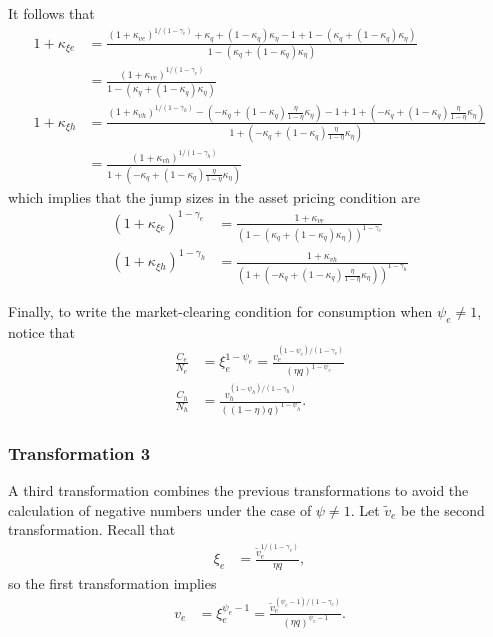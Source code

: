 \documentclass[12 pt, oneside]{article}
\theoremstyle{definition}
\theoremstyle{definition}
\theoremstyle{definition}
\begin{document}
It follows that
\begin{align*}
  1 + \kappa_{\xi e} & = \frac{(1 + \kappa_{ve})^{1 / (1 - \gamma_e)} + \kappa_q + (1 - \kappa_q)\kappa_\eta - 1 + 1 - (\kappa_q + (1 - \kappa_q)\kappa_\eta)}{1 - (\kappa_q + (1 - \kappa_q)\kappa_\eta)}\\
                     & = \frac{(1 + \kappa_{ve})^{1 / (1 - \gamma_e)}}{1 - (\kappa_q + (1 - \kappa_q)\kappa_\eta)}\\
1 + \kappa_{\xi h} & = \frac{(1 + \kappa_{v h})^{1 / (1 - \gamma_h)} - \left(-\kappa_q + (1 - \kappa_q)\frac{\eta}{1 - \eta}\kappa_\eta\right) - 1 + 1 + \left( -\kappa_q + (1 - \kappa_q)\frac{\eta}{1 - \eta}\kappa_\eta\right)}{1 + \left( -\kappa_q + (1 - \kappa_q)\frac{\eta}{1 - \eta}\kappa_\eta\right)}\\
                     & = \frac{(1 + \kappa_{v h})^{1 / (1 - \gamma_h)}}{1 + \left( -\kappa_q + (1 - \kappa_q)\frac{\eta}{1 - \eta}\kappa_\eta\right)}
\end{align*}
which implies that the jump sizes in the asset pricing condition are
\begin{align*}
  (1 + \kappa_{\xi e})^{1 - \gamma_e} & = \frac{1 + \kappa_{ve}}{(1 - (\kappa_q + (1 - \kappa_q)\kappa_\eta))^{1 - \gamma_e}}\\
  (1 + \kappa_{\xi h})^{1 - \gamma_h} & = \frac{1 + \kappa_{vh}}{\left(1 + \left( -\kappa_q + (1 - \kappa_q)\frac{\eta}{1 - \eta}\kappa_\eta\right)\right)^{1 - \gamma_h}}
\end{align*}

Finally, to write the market-clearing condition for consumption when $\psi_e\neq 1$, notice that
\begin{align*}
\frac{C_e}{N_e} & = \xi_e^{1 - \psi_e}  = \frac{v_e^{(1 - \psi_e) / ( 1- \gamma_e)}}{(\eta q)^{1 - \psi_e}}\\
\frac{C_h}{N_h} & = \frac{v_h^{(1 - \psi_h) / ( 1- \gamma_h)}}{((1 - \eta) q)^{1 - \psi_h}}.
\end{align*}


\subsubsection{Transformation 3}
A third transformation combines the previous transformations to avoid the calculation of negative numbers under the case of $\psi\neq 1$. Let $\tilde{v}_e$ be the second transformation. Recall that
\begin{align*}
\xi_e & = \frac{\tilde{v}_e^{1 / ( 1- \gamma_e)}}{\eta q},
\end{align*}
so the first transformation implies
\begin{align*}
v_e & = \xi_e^{\psi_e - 1} =  \frac{\tilde{v}_e^{(\psi_e - 1) / ( 1- \gamma_e)} }{(\eta q)^{\psi_e - 1}}.
\end{align*}
\end{document}

